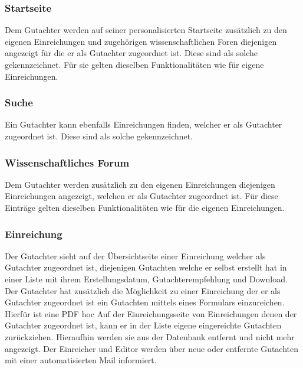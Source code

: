\subsubsection{Startseite}
\begin{description}
    \XXitem{} Dem Gutachter werden auf seiner personalisierten Startseite zusätzlich zu den eigenen
    Einreichungen und zugehörigen wissenschaftlichen Foren diejenigen angezeigt für die er als Gutachter
    zugeordnet ist. Diese sind als solche gekennzeichnet.
    Für sie gelten dieselben Funktionalitäten wie für eigene Einreichungen. %
\end{description}

\subsubsection{Suche}
\begin{description}
    \XXitem{} Ein Gutachter kann ebenfalls Einreichungen finden, welcher er als Gutachter
    zugeordnet ist. Diese sind als solche gekennzeichnet.
\end{description}

\subsubsection{Wissenschaftliches Forum}
\begin{description}
    \XXitem{} Dem Gutachter werden zusätzlich zu den eigenen Einreichungen diejenigen Einreichungen angezeigt,
    welchen er als Gutachter zugeordnet ist. Für diese Einträge gelten dieselben Funktionalitäten wie für die
    eigenen Einreichungen. %
\end{description}

\subsubsection{Einreichung}
\begin{description}
    \XXitem{} Der Gutachter sieht auf der Übersichtseite einer Einreichung welcher als Gutachter
    zugeordnet ist, diejenigen Gutachten welche er selbst erstellt hat in einer
    Liste mit ihrem Erstellungsdatum, Gutachterempfehlung und Download.
    \XXitem{} Der Gutachter hat zusätzlich die Möglichkeit zu einer Einreichung der er als Gutachter zugeordnet ist
    ein Gutachten mittels eines Formulars einzureichen. Hierfür ist eine PDF hoc
     Auf der Einreichungsseite von Einreichungen denen der Gutachter zugeordnet ist,
    kann er in der Liste eigene eingereichte Gutachten zurückziehen. Hieraufhin werden sie aus
    der Datenbank entfernt und nicht mehr angezeigt.
    \XXitem{} Der Einreicher und Editor werden über neue oder entfernte Gutachten mit einer automatisierten
    Mail informiert.
\end{description}

